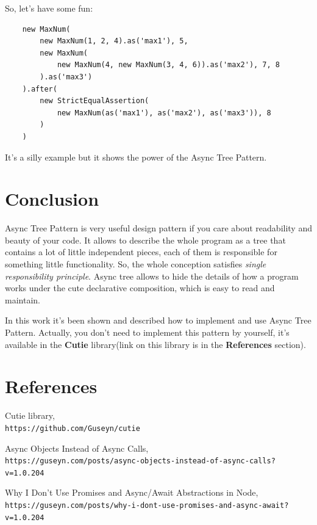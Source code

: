 \documentclass{article}
\begin{document}
So, let's have some fun:

\begin{verbatim}
    new MaxNum(
        new MaxNum(1, 2, 4).as('max1'), 5, 
        new MaxNum(
            new MaxNum(4, new MaxNum(3, 4, 6)).as('max2'), 7, 8
        ).as('max3')
    ).after(
        new StrictEqualAssertion(
            new MaxNum(as('max1'), as('max2'), as('max3')), 8 
        )
    )
\end{verbatim}

It's a silly example but it shows the power of the Async Tree Pattern.

\section{Conclusion}

Async Tree Pattern is very useful design pattern if you care about readability and beauty of your code. It allows to describe the whole program as a tree that contains a lot of little independent pieces, each of them is responsible for something little functionality. So, the whole conception satisfies \textit{single responsibility principle}. Async tree allows to hide the details of how a program works under the cute declarative composition, which is easy to read and maintain.

In this work it's been shown and described how to implement and use Async Tree Pattern. Actually, you don't need to implement this pattern by yourself, it's available in the \textbf{Cutie} library(link on this library is in the \textbf{References} section). 

\section{References}

\begin{thebibliography}{9}

Cutie library,
\\\texttt{https://github.com/Guseyn/cutie}

Async Objects Instead of Async Calls,
\\\texttt{https://guseyn.com/posts/async-objects-instead-of-async-calls?v=1.0.204}

Why I Don't Use Promises and Async/Await Abstractions in Node,
\\\texttt{https://guseyn.com/posts/why-i-dont-use-promises-and-async-await?v=1.0.204}

\end{thebibliography}

\newpage

\tableofcontents
\end{document}
